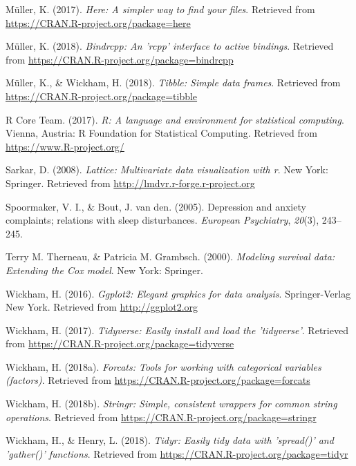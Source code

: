 \documentclass[man]{apa6}
\theoremstyle{definition}
\theoremstyle{definition}
\theoremstyle{definition}
\theoremstyle{remark}
\begin{document}
\hypertarget{ref-R-here}{}
Müller, K. (2017). \emph{Here: A simpler way to find your files}.
Retrieved from \url{https://CRAN.R-project.org/package=here}

\hypertarget{ref-R-bindrcpp}{}
Müller, K. (2018). \emph{Bindrcpp: An 'rcpp' interface to active
bindings}. Retrieved from
\url{https://CRAN.R-project.org/package=bindrcpp}

\hypertarget{ref-R-tibble}{}
Müller, K., \& Wickham, H. (2018). \emph{Tibble: Simple data frames}.
Retrieved from \url{https://CRAN.R-project.org/package=tibble}

\hypertarget{ref-R-base}{}
R Core Team. (2017). \emph{R: A language and environment for statistical
computing}. Vienna, Austria: R Foundation for Statistical Computing.
Retrieved from \url{https://www.R-project.org/}

\hypertarget{ref-R-lattice}{}
Sarkar, D. (2008). \emph{Lattice: Multivariate data visualization with
r}. New York: Springer. Retrieved from
\url{http://lmdvr.r-forge.r-project.org}

\hypertarget{ref-spoormaker2005depression}{}
Spoormaker, V. I., \& Bout, J. van den. (2005). Depression and anxiety
complaints; relations with sleep disturbances. \emph{European
Psychiatry}, \emph{20}(3), 243--245.

\hypertarget{ref-R-survival-book}{}
Terry M. Therneau, \& Patricia M. Grambsch. (2000). \emph{Modeling
survival data: Extending the Cox model}. New York: Springer.

\hypertarget{ref-R-ggplot2}{}
Wickham, H. (2016). \emph{Ggplot2: Elegant graphics for data analysis}.
Springer-Verlag New York. Retrieved from \url{http://ggplot2.org}

\hypertarget{ref-R-tidyverse}{}
Wickham, H. (2017). \emph{Tidyverse: Easily install and load the
'tidyverse'}. Retrieved from
\url{https://CRAN.R-project.org/package=tidyverse}

\hypertarget{ref-R-forcats}{}
Wickham, H. (2018a). \emph{Forcats: Tools for working with categorical
variables (factors)}. Retrieved from
\url{https://CRAN.R-project.org/package=forcats}

\hypertarget{ref-R-stringr}{}
Wickham, H. (2018b). \emph{Stringr: Simple, consistent wrappers for
common string operations}. Retrieved from
\url{https://CRAN.R-project.org/package=stringr}

\hypertarget{ref-R-tidyr}{}
Wickham, H., \& Henry, L. (2018). \emph{Tidyr: Easily tidy data with
'spread()' and 'gather()' functions}. Retrieved from
\url{https://CRAN.R-project.org/package=tidyr}
\end{document}
